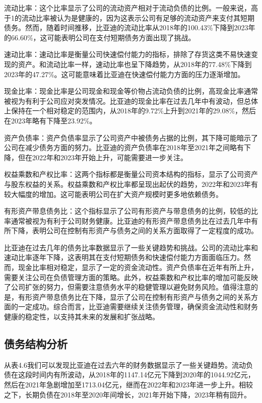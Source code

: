 流动比率：这个比率显示了公司的流动资产相对于流动负债的比例。一般来说，高于1的流动比率被认为是健康的，因为这表示公司有足够的流动资产来支付其短期债务。然而，随着时间推移，比亚迪的流动比率从2018年的100.43\%下降到2023年的66.60\%，这可能表明公司在支付短期债务方面出现了挑战。

速动比率：速动比率是衡量公司快速偿付能力的指标，排除了存货这类不易快速变现的资产。和流动比率一样，速动比率也呈下降趋势，从2018年的77.48\%下降到2023年的47.27\%。这可能意味着比亚迪在快速偿付能力方面的压力逐渐增加。

现金比率：现金比率是公司现金和现金等价物占流动负债的比例，高现金比率通常被视为有利于公司应对突发情况。比亚迪的现金比率在过去几年中有波动，但总体上保持在一个相对稳定的范围内，从2018年的9.72\%上升到2021年的29.08\%，然后在2023年略有下降至23.92\%。

资产负债率：资产负债率显示了公司资产中被债务占据的比例，其下降可能暗示了公司在减少债务方面的努力。比亚迪的资产负债率在2018年至2021年之间略有下降，但在2022年和2023年开始上升，可能需要进一步关注。

权益乘数和产权比率：这两个指标都是衡量公司资本结构的指标，显示了公司资产与股东权益的关系。权益乘数和产权比率都呈现出起伏的趋势，2022年和2023年有较大幅度的增加。这可能表明公司在扩大资产规模时更多地依赖债务。

有形资产带息债务比：这个指标显示了公司有形资产与带息债务的比例，较低的比率通常被视为有利于公司财务健康。比亚迪的有形资产带息债务比在过去几年中有所下降，表明公司在控制有形资产与债务之间的关系方面取得了一定程度的成功。


比亚迪在过去几年的债务比率数据显示了一些关键趋势和挑战。公司的流动比率和速动比率逐年下降，这表明其在支付短期债务和快速偿付能力方面面临压力。然而，现金比率相对稳定，显示了一定的资金流动性。资产负债率在近年有所上升，需要关注公司在负债管理方面的策略。此外，权益乘数和产权比率的增加可能反映了公司扩张的努力，但需要注意债务水平的稳健管理以避免财务风险。值得注意的是，有形资产带息债务比在下降，显示了公司在控制有形资产与债务之间的关系方面的一定成功。综合而言，比亚迪需要继续关注债务管理，确保资金流动性和财务健康的稳定性，以支持其未来的发展和扩张战略。
\subsection{债务结构分析}
从表4.6我们可以发现比亚迪在过去六年的财务数据显示了一些关键趋势。流动负债在这段时间内有所波动，从2018年的1147.14亿元下降到2020年的1044.92亿元，然后在2021年急剧增加至1713.04亿元，继而在2022年和2023年进一步上升。相较之下，长期负债在2018年至2020年间增长，2021年开始下降，2023年稍有回升。

